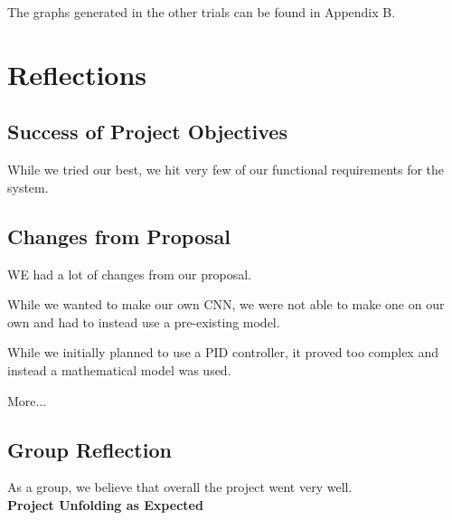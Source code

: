 \documentclass[titlepage, draft]{article}
\begin{document}
{The graphs generated in the other trials can be found in Appendix B.

\section{Reflections}


\subsection{Success of Project Objectives}

While we tried our best, we hit very few of our functional requirements for the system.

\subsection{Changes from Proposal}

WE had a lot of changes from our proposal.

While we wanted to make our own CNN, we were not able to make one on our own and had to instead use a pre-existing model.

While we initially planned to use a PID controller, it proved too complex and instead a mathematical model was used.

More...

\subsection{Group Reflection}

As a group, we believe that overall the project went very well.\\

\textbf{Project Unfolding as Expected}

}
\end{document}
